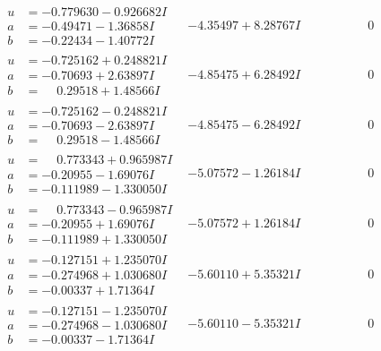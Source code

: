 \documentclass[1p]{elsarticle_modified}
\theoremstyle{definition}
\begin{document}
$$\begin{array}{c|c|c}
\begin{aligned}
u &= -0.779630 - 0.926682 I \\
a &= -0.49471 - 1.36858 I \\
b &= -0.22434 - 1.40772 I\end{aligned}
 & -4.35497 + 8.28767 I & \phantom{-0.000000 } 0 \\ \hline\begin{aligned}
u &= -0.725162 + 0.248821 I \\
a &= -0.70693 + 2.63897 I \\
b &= \phantom{-}0.29518 + 1.48566 I\end{aligned}
 & -4.85475 + 6.28492 I & \phantom{-0.000000 } 0 \\ \hline\begin{aligned}
u &= -0.725162 - 0.248821 I \\
a &= -0.70693 - 2.63897 I \\
b &= \phantom{-}0.29518 - 1.48566 I\end{aligned}
 & -4.85475 - 6.28492 I & \phantom{-0.000000 } 0 \\ \hline\begin{aligned}
u &= \phantom{-}0.773343 + 0.965987 I \\
a &= -0.20955 - 1.69076 I \\
b &= -0.111989 - 1.330050 I\end{aligned}
 & -5.07572 - 1.26184 I & \phantom{-0.000000 } 0 \\ \hline\begin{aligned}
u &= \phantom{-}0.773343 - 0.965987 I \\
a &= -0.20955 + 1.69076 I \\
b &= -0.111989 + 1.330050 I\end{aligned}
 & -5.07572 + 1.26184 I & \phantom{-0.000000 } 0 \\ \hline\begin{aligned}
u &= -0.127151 + 1.235070 I \\
a &= -0.274968 + 1.030680 I \\
b &= -0.00337 + 1.71364 I\end{aligned}
 & -5.60110 + 5.35321 I & \phantom{-0.000000 } 0 \\ \hline\begin{aligned}
u &= -0.127151 - 1.235070 I \\
a &= -0.274968 - 1.030680 I \\
b &= -0.00337 - 1.71364 I\end{aligned}
 & -5.60110 - 5.35321 I & \phantom{-0.000000 } 0 \\ \hline\begin{aligned}

\end{aligned}
\end{array}$$
\end{document}
